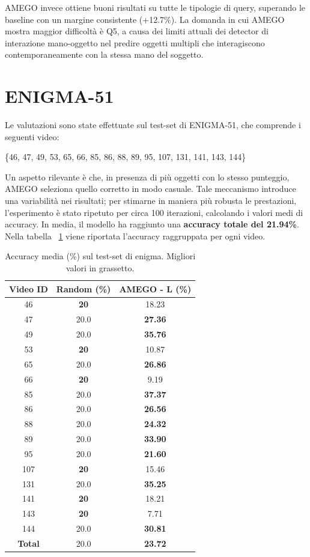 AMEGO invece ottiene buoni risultati su tutte le tipologie di query, superando le baseline con un margine consistente (+12.7\%). La domanda in cui AMEGO mostra maggior difficoltà è Q5, a causa dei limiti attuali dei detector di interazione mano-oggetto nel predire oggetti multipli che interagiscono contemporaneamente con la stessa mano del soggetto.

\section{ENIGMA-51}
Le valutazioni sono state effettuate sul test-set di ENIGMA-51, che comprende i seguenti video: 

\begin{center}
    \{46, 47, 49, 53, 65, 66, 85, 86, 88, 89, 95, 107, 131, 141, 143, 144\}
\end{center}

Un aspetto rilevante è che, in presenza di più oggetti con lo stesso punteggio, AMEGO seleziona quello corretto in modo casuale. 
Tale meccanismo introduce una variabilità nei risultati; per stimarne in maniera più robusta le prestazioni, 
l'esperimento è stato ripetuto per circa 100 iterazioni, calcolando i valori medi di accuracy.
In media, il modello ha raggiunto una \textbf{accuracy totale del 21.94\%}. 
Nella tabella ~\ref{table:acc_videos} viene riportata l'accuracy raggruppata per ogni video.

\begin{table}[ht]
    \centering
    \caption{Accuracy media (\%) sul test-set di enigma. Migliori valori in grassetto.}
    {\footnotesize
    \begin{tabular}{|c|c|c|} 
    \hline
    \textbf{Video ID} & \textbf{Random (\%)} & \textbf{AMEGO - L (\%)} \\
    \hline
    46  & \textbf{20} & 18.23 \\
    47  & 20.0 & \textbf{27.36} \\
    49  & 20.0 & \textbf{35.76} \\
    53  & \textbf{20} & 10.87 \\
    65  & 20.0 & \textbf{26.86} \\
    66  & \textbf{20} & 9.19 \\
    85  & 20.0 & \textbf{37.37} \\
    86  & 20.0 & \textbf{26.56} \\
    88  & 20.0 & \textbf{24.32} \\
    89  & 20.0 & \textbf{33.90} \\
    95  & 20.0 & \textbf{21.60} \\
    107 & \textbf{20} & 15.46 \\
    131 & 20.0 & \textbf{35.25} \\
    141 & \textbf{20} & 18.21 \\
    143 & \textbf{20} & 7.71 \\
    144 & 20.0 & \textbf{30.81} \\
    \hline
    \textbf{Total} & 20.0 & \textbf{23.72} \\
    \hline
    \end{tabular}%
    }
    \label{table:acc_videos}
\end{table}

